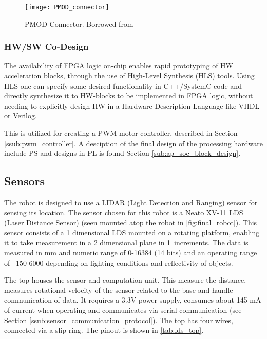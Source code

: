 \documentclass[Main]{subfiles}
\begin{document}
		\begin{figure}[H]
			\centering
			\texttt{[image: PMOD\_connector]}
			\caption{PMOD Connector. Borrowed from \cite{Digilent2014}}
			\label{fig:pmod}
		\end{figure}

		\subsubsection{HW/SW Co-Design} %
		\label{ssub:hw_sw_co_design}

			The availability of FPGA logic on-chip enables rapid prototyping of HW acceleration blocks, through the use of High-Level Synthesis (HLS) tools.
			Using HLS one can specify some desired functionality in C++/SystemC code and directly synthesize it to HW-blocks to be implemented in FPGA logic, without needing to explicitly design HW in a Hardware Description Language like VHDL or Verilog.

			This is utilized for creating a PWM motor controller, described in Section \ref{ssub:pwm_controller}.
			A desciption of the final design of the processing hardware include PS and designs in PL is found Section \ref{sub:ap_soc_block_design}.
			
	

	\subsection{Sensors} %
	\label{sub:sensor}

		The robot is designed to use a LIDAR (Light Detection and Ranging) sensor for sensing its location.
		The sensor chosen for this robot is a Neato XV-11 LDS (Laser Distance Sensor) (seen mounted atop the robot in \autoref{fig:final_robot}).
		This sensor consists of a 1 dimensional LDS mounted on a rotating platform, enabling it to take measurement in a 2 dimensional plane in 1\degree\ increments.
		The data is measured in mm and numeric range of 0-16384 (14 bits) and an operating range of ~150-6000 depending on lighting conditions and reflectivity of objects.

		The top houses the sensor and computation unit. This measure the distance, measures rotational velocity of the sensor related to the base and handle communication of data.
		It requires a 3.3V power supply, consumes about 145 mA of current when operating and communicates via serial-communication (see Section \ref{ssub:sensor_communication_protocol}).
		The top has four wires, connected via a slip ring. 
		The pinout is shown in \autoref{tab:lds_top}.
\end{document}
